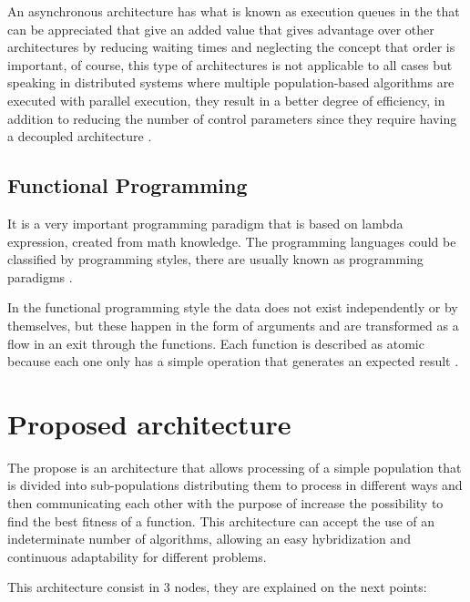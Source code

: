 \documentclass[runningheads]{llncs}
\begin{document}
An asynchronous architecture has what is known as execution queues in the that can be appreciated that give an added value that gives advantage 
over other architectures by reducing waiting times and neglecting the concept that order is important, of course, this type of architectures 
is not applicable to all cases but speaking in distributed systems where multiple population-based algorithms are executed
with parallel execution, they result in a better degree of efficiency, in addition to reducing the number of control parameters 
since they require having a decoupled architecture \cite{Ma2019,Santander-jim2018}.

\subsection{Functional Programming}

It is a very important programming paradigm that is based on lambda expression, created from math knowledge.
The programming languages could be classified by programming styles, there are usually known as programming paradigms \cite{Kunasaikaran2016}.

In the functional programming style the data does not exist independently or by themselves,
but these happen in the form of arguments and are transformed as a flow in an exit through the functions. Each function is described as atomic
because each one only has a simple operation that generates an expected result \cite{Kunasaikaran2016}.


\section{Proposed architecture}

The propose is an architecture that allows processing of a simple population that
is divided into sub-populations distributing them to process in different ways
and then communicating each other with the purpose of increase the possibility to
find the best fitness of a function. This architecture can accept the use of an indeterminate number of algorithms, allowing an easy hybridization and continuous
adaptability for different problems.

This architecture consist in 3 nodes, they are explained on the next points:
\end{document}
